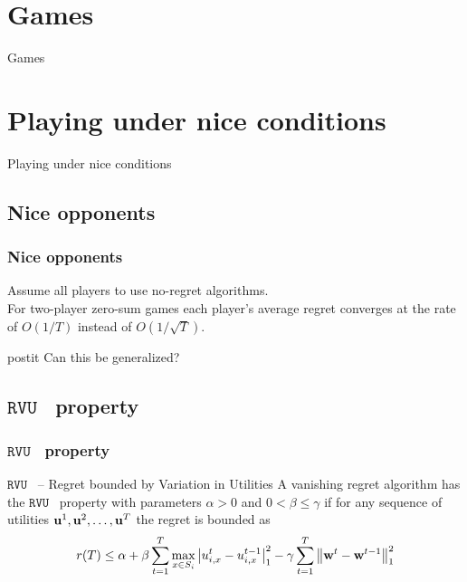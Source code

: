 \documentclass{beamer}
\renewcommand{\vec}[1]{\ensuremath{{\bf #1}}}
\newcommand{\myprop}{\ensuremath{\texttt{RVU}}}
\begin{document}
\section{Games}
\begin{frame}[c]
	\begin{center}
		\Huge Games
	\end{center}
\end{frame}





\section{Playing under nice conditions}
\begin{frame}[c]
	\begin{center}
		\Huge Playing under nice conditions
	\end{center}
\end{frame}
\subsection{Nice opponents}
\begin{frame}
	\frametitle{Nice opponents}
%
	Assume all players to use no-regret algorithms.\\ \pause
	\vspace{1em} 
	For two-player zero-sum games each player's average regret converges at the rate of $O(1/T)$ instead of $O(1/\sqrt{T})$.\\ \pause
	\vspace{1em}
	\begin{beamercolorbox}[sep=1em]{postit}
		Can this be generalized?
	\end{beamercolorbox}
	
\end{frame}


\subsection{\myprop~ property}

\begin{frame}
	\frametitle{\myprop~ property}
	\begin{block}{\myprop~ -- Regret bounded by Variation in Utilities}
		A vanishing regret algorithm has the \myprop~ property with parameters $\alpha>0$ and $0<\beta\leq\gamma$  if for any sequence of utilities $\vec{u}^1, \vec{u}^2, \ldots, \vec{u}^T$ the regret is bounded as 
		\begin{equation*}
		r(T) \leq \alpha
		+\beta \sum_{t=1}^{T} \max_{x \in S_i} \left| u_{i,x}^t - u_{i,x}^{t-1} \right|_1^2 -
		\gamma\sum_{t=1}^{T} \left\|\vec{w}^{t} - \vec{w}^{t-1}\right\|^2_1
		\end{equation*}  
	\end{block}
	

\end{frame}
\end{document}
